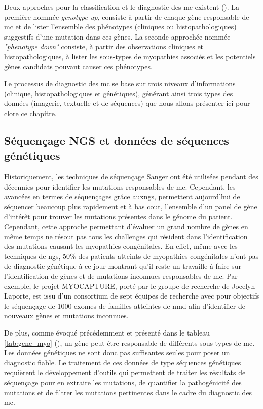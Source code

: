 Deux approches pour la classification et le diagnostic des \gls{mc} existent (\cite{north_approach_2014}). La première nommée \textit{genotype-up}, consiste à partir de chaque gène responsable de \gls{mc} et de lister l'ensemble des phénotypes (cliniques ou histopathologiques) suggestifs d'une mutation dans ces gènes. La seconde approchée nommée \textit{"phenotype down"} consiste, à partir des observations cliniques et histopathologiques, à lister les sous-types de myopathies associés et les potentiels gènes candidats pouvant causer ces phénotypes.

Le processus de diagnostic des \gls{mc} se base sur trois niveaux d'informations (clinique, histopathologiques et génétiques), générant ainsi trois types des données (imagerie, textuelle et de séquences) que nous allons présenter ici pour clore ce chapitre.

\subsection{Séquençage NGS et données de séquences génétiques}
Historiquement, les techniques de séquençage Sanger ont été utilisées pendant des décennies pour identifier les mutations responsables de \gls{mc}. Cependant, les avancées en termes de séquençages grâce aux\gls{ngs}, permettent aujourd'hui de séquencer beaucoup plus rapidement et à bas cout, l'ensemble d'un panel de gène d'intérêt pour trouver les mutations présentes dans le génome du patient. Cependant, cette approche permettant d'évaluer un grand nombre de gènes en même temps ne résout pas tous les challenges qui résident dans l'identification des mutations causant les myopathies congénitales. En effet, même avec les techniques de \gls{ngs}, 50\% des patients atteints de myopathies congénitales n'ont pas de diagnostic génétique à ce jour montrant qu'il reste un travaille à faire sur l'identification de gènes et de mutations inconnues responsables de \gls{mc}. Par exemple, le projet MYOCAPTURE, porté par le groupe de recherche de Jocelyn Laporte, est issu d'un consortium de sept équipes de recherche avec pour objectifs le séquençage de 1000 exomes de familles atteintes de \gls{nmd} afin d'identifier de nouveaux gènes et mutations inconnues.

De plus, comme évoqué précédemment et présenté dans le tableau \ref{tab:gene_myo} (\cite{cassandrini_congenital_2017}), un gène peut être responsable de différents sous-types de \gls{mc}. Les données génétiques ne sont donc pas suffisantes seules pour poser un diagnostic fiable. Le traitement de ces données de type séquences génétiques requièrent le développement d'outils qui permettent de traiter les résultats de séquençage pour en extraire les mutations, de quantifier la pathogénicité des mutations et de filtrer les mutations pertinentes dans le cadre du diagnostic des \gls{mc}. 

